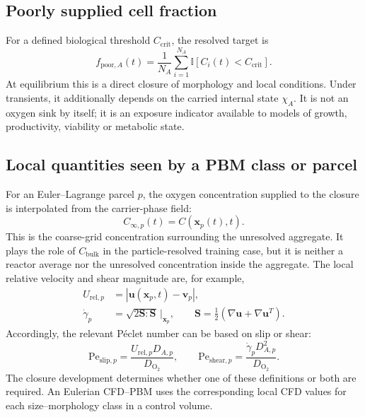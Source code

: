 \documentclass[11pt,a4paper]{article}
\newcommand{\Pe}{\mathrm{Pe}}
\newcommand{\Otwo}{\mathrm{O}_2}
\begin{document}
\subsection{Poorly supplied cell fraction}

For a defined biological threshold \(C_{\mathrm{crit}}\), the resolved target is
\begin{equation}
  f_{\mathrm{poor},A}(t)
  =\frac{1}{N_A}\sum_{i=1}^{N_A}
  \mathbb{I}\!\left[C_i(t)<C_{\mathrm{crit}}\right].
  \label{eq:fpoor}
\end{equation}
At equilibrium this is a direct closure of morphology and local conditions.
Under transients, it additionally depends on the carried internal state
\(\chi_A\). It is not an oxygen sink by itself; it is an exposure indicator
available to models of growth, productivity, viability or metabolic state.

\subsection{Local quantities seen by a PBM class or parcel}

For an Euler--Lagrange parcel \(p\), the oxygen concentration supplied to the
closure is interpolated from the carrier-phase field:
\begin{equation}
  C_{\infty,p}(t)
  =
  C\!\left(\boldsymbol{x}_p(t),t\right).
  \label{eq:local_oxygen}
\end{equation}
This is the coarse-grid concentration surrounding the unresolved aggregate. It
plays the role of \(C_{\mathrm{bulk}}\) in the particle-resolved training case,
but it is neither a reactor average nor the unresolved concentration inside
the aggregate. The local relative velocity and shear magnitude are, for
example,
\begin{align}
  U_{\mathrm{rel},p}
  &=
  \left|
  \boldsymbol{u}(\boldsymbol{x}_p,t)-\boldsymbol{v}_p
  \right|,\\
  \dot{\gamma}_p
  &=
  \sqrt{2\boldsymbol{S}:\boldsymbol{S}}\,
  \big|_{\boldsymbol{x}_p},
  \qquad
  \boldsymbol{S}
  =
  \tfrac{1}{2}
  \left(\nabla\boldsymbol{u}+\nabla\boldsymbol{u}^{T}\right).
\end{align}
Accordingly, the relevant P\'eclet number can be based on slip or shear:
\begin{equation}
  \Pe_{\mathrm{slip},p}
  =\frac{U_{\mathrm{rel},p}D_{A,p}}{D_{\Otwo}},
  \qquad
  \Pe_{\mathrm{shear},p}
  =\frac{\dot{\gamma}_pD_{A,p}^{2}}{D_{\Otwo}}.
  \label{eq:local_pe}
\end{equation}
The closure development determines whether one of these definitions or both
are required. An Eulerian CFD--PBM uses the corresponding local CFD values for
each size--morphology class in a control volume.
\end{document}
